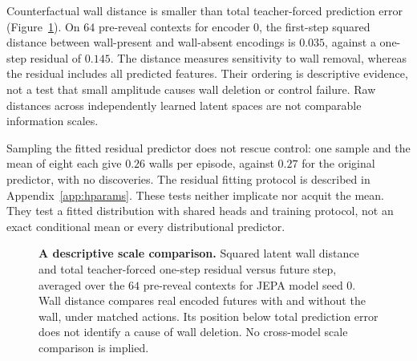 Counterfactual wall distance is smaller than total teacher-forced prediction error
(Figure~\ref{fig:geometry}). On $64$ pre-reveal contexts for encoder $0$, the first-step squared
distance between wall-present and wall-absent encodings is $0.035$, against a one-step residual
of $0.145$. The distance measures sensitivity to wall removal, whereas the residual includes all
predicted features. Their ordering is descriptive evidence, not a test that small amplitude causes
wall deletion or control failure. Raw distances across independently learned latent spaces are not
comparable information scales.

Sampling the fitted residual predictor does not rescue control: one sample and the mean of eight
each give $0.26$ walls per episode, against $0.27$ for the original predictor, with no discoveries.
The residual fitting protocol is described in Appendix~\ref{app:hparams}.
These tests neither implicate nor acquit the mean. They test a fitted distribution with shared
heads and training protocol, not an exact conditional mean or every distributional predictor.

\begin{figure}[t]
\centering
\renewcommand{\figureheight}{1.40in}
\caption{\textbf{A descriptive scale comparison.} Squared latent wall distance and total
teacher-forced one-step residual versus future step, averaged over the $64$ pre-reveal contexts
for JEPA model seed $0$. Wall distance compares real encoded futures with and without the wall,
under matched actions. Its position below total prediction error does not identify a cause of
wall deletion. No cross-model scale comparison is implied.}
\label{fig:geometry}
\end{figure}
